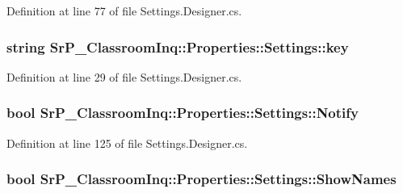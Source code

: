 \-Definition at line 77 of file \-Settings.\-Designer.\-cs.

\hypertarget{class_sr_p___classroom_inq_1_1_properties_1_1_settings_adcf8c99db5c2978cebd00b77880dc4f9}{
\subsubsection[{key}]{\setlength{\rightskip}{0pt plus 5cm}string \-Sr\-P\-\_\-\-Classroom\-Inq\-::\-Properties\-::\-Settings\-::key}}
\label{class_sr_p___classroom_inq_1_1_properties_1_1_settings_adcf8c99db5c2978cebd00b77880dc4f9}


\-Definition at line 29 of file \-Settings.\-Designer.\-cs.

\hypertarget{class_sr_p___classroom_inq_1_1_properties_1_1_settings_ad0c83bd5c1a79ad9f1690f5096d48306}{
\subsubsection[{\-Notify}]{\setlength{\rightskip}{0pt plus 5cm}bool \-Sr\-P\-\_\-\-Classroom\-Inq\-::\-Properties\-::\-Settings\-::\-Notify}}
\label{class_sr_p___classroom_inq_1_1_properties_1_1_settings_ad0c83bd5c1a79ad9f1690f5096d48306}


\-Definition at line 125 of file \-Settings.\-Designer.\-cs.

\hypertarget{class_sr_p___classroom_inq_1_1_properties_1_1_settings_abb110d7ebcceac8e89e8e7fced9da2b4}{
\subsubsection[{\-Show\-Names}]{\setlength{\rightskip}{0pt plus 5cm}bool \-Sr\-P\-\_\-\-Classroom\-Inq\-::\-Properties\-::\-Settings\-::\-Show\-Names}}
\label{class_sr_p___classroom_inq_1_1_properties_1_1_settings_abb110d7ebcceac8e89e8e7fced9da2b4}


